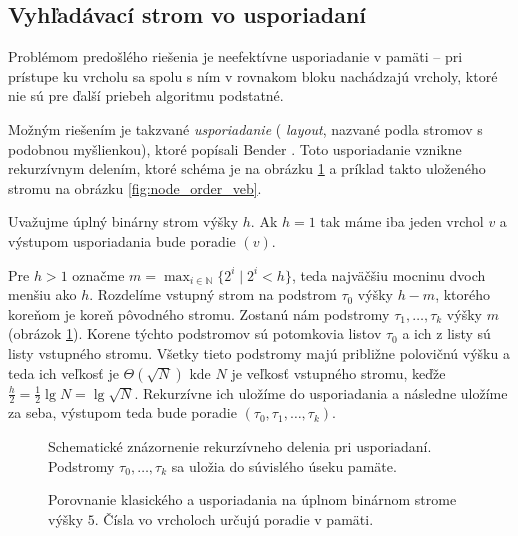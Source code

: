 \subsection{Vyhľadávací strom vo  usporiadaní} \label{sec:static-obliv}
Problémom predošlého riešenia je neefektívne usporiadanie v pamäti -- pri prístupe ku vrcholu sa spolu s ním v rovnakom bloku nachádzajú vrcholy, ktoré nie sú pre ďalší priebeh algoritmu podstatné. 

Možným riešením je takzvané  \emph{usporiadanie} (\vEB{} \emph{layout}, nazvané podla  stromov s podobnou myšlienkou), ktoré popísali Bender \etal\citep{btreeshort, btreefull}. Toto usporiadanie vznikne rekurzívnym delením, ktoré schéma je na obrázku \ref{fig:veblayout_scheme} a príklad takto uloženého stromu na obrázku \ref{fig:node_order_veb}.

Uvažujme úplný binárny strom výšky $h$. Ak $h=1$ tak máme iba jeden vrchol $v$ a výstupom usporiadania bude poradie $(v)$.

Pre $h>1$ označme $m = \max_{i\in\mathbb{N}}\{2^i \mid 2^i < h\}$, teda najväčšiu mocninu dvoch menšiu ako $h$. Rozdelíme vstupný strom na podstrom $\tau_0$ výšky $h-m$, ktorého koreňom je koreň pôvodného stromu. Zostanú nám podstromy $\tau_1,\dotsc,\tau_k$ výšky $m$ (obrázok \ref{fig:veblayout_scheme}). Korene týchto podstromov sú potomkovia listov $\tau_0$ a ich z listy sú listy vstupného stromu. Všetky tieto podstromy majú približne polovičnú výšku a teda ich veľkosť je $\Theta(\sqrt{N})$ kde $N$ je veľkosť vstupného stromu, keďže $\frac{h}{2} = \frac{1}{2}\lg{N} = \lg{\sqrt{N}}$. Rekurzívne ich uložíme do  usporiadania a následne uložíme za seba, výstupom teda bude poradie $(\tau_0,\tau_1,\dotsc,\tau_k)$.

\begin{figure}
    \centering
    \resizebox{0.9\textwidth}{!}{
        
    }
    \caption[Schematické znázornenie rekurzívneho delenia]{Schematické znázornenie rekurzívneho delenia pri  usporiadaní. Podstromy $\tau_0,\dotsc,\tau_k$ sa uložia do súvislého úseku pamäte.}
    \label{fig:veblayout_scheme}
\end{figure}

\begin{figure}
    \centering
    \caption[Porovnanie klasického a  usporiadania]{Porovnanie klasického a  usporiadania na úplnom binárnom strome výšky $5$. Čísla vo vrcholoch určujú poradie v pamäti.}
    \label{fig:node_order_comparison}
\end{figure}

